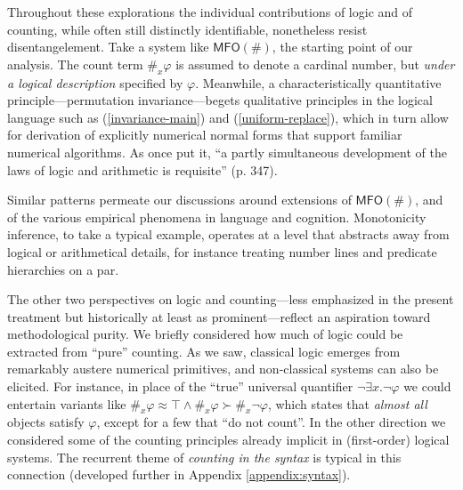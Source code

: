 \documentclass[12pt,oneside,reqno]{amsart}
\theoremstyle{definition}
\begin{document}
Throughout these explorations the individual contributions of logic and of counting, while often still distinctly identifiable, nonetheless resist disentangelement. Take a system like $\mathsf{MFO}(\#)$, the starting point of our analysis. The count term $\#_x\varphi$ is assumed to denote a cardinal number, but \emph{under a logical description} specified  by $\varphi$. Meanwhile, a characteristically quantitative principle---permutation invariance---begets qualitative principles in the logical language such as (\ref{invariance-main}) and (\ref{uniform-replace}), which in turn allow for derivation of explicitly numerical normal forms that support familiar numerical algorithms. As \cite{Hilbert} once put it, ``a partly simultaneous development of the laws of logic and
 arithmetic is requisite'' (p. 347).

Similar patterns permeate our discussions around extensions of $\mathsf{MFO}(\#)$, and of the various empirical phenomena in language and cognition. Monotonicity inference, to take a typical example, operates at a level that abstracts away from logical or arithmetical details, for instance treating number lines and predicate hierarchies on a par. 


The other two perspectives on logic and counting---less emphasized in the present treatment but historically at least as prominent---reflect an aspiration toward methodological purity. We briefly considered how much of logic could be extracted from ``pure'' counting. As we saw, classical logic emerges from remarkably austere numerical primitives, and non-classical systems can also be elicited. For instance, in place of the ``true'' universal quantifier $\neg \exists x. \neg \varphi$ we could entertain variants like $\#_x\varphi \approx \top \wedge \#_x\varphi \succ \#_x\neg\varphi$, which states that \emph{almost all} objects satisfy $\varphi$, except for a few that ``do not count''. In the other direction we considered some of the counting principles already implicit in (first-order) logical systems. The recurrent theme of \emph{counting in the syntax} is typical in this connection (developed further in Appendix \ref{appendix:syntax}). 
\end{document}
